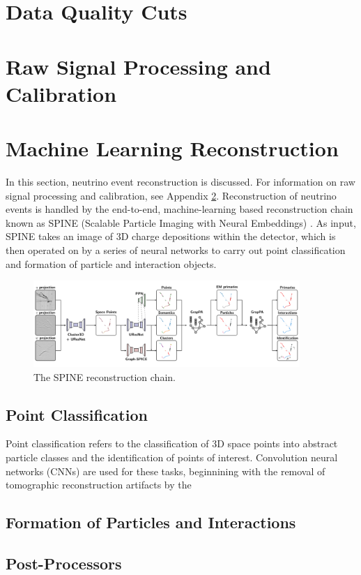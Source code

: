 \documentclass[]{article}
\begin{document}
\begin{appendices}

\section{Data Quality Cuts}
\label{appendix:dataquality}

\section{Raw Signal Processing and Calibration}
\label{appendix:sigandcalib}

\section{Machine Learning Reconstruction}
\label{appendix:mlreco}
In this section, neutrino event reconstruction is discussed.  For information on raw signal processing and calibration, see Appendix \ref{appendix:sigandcalib}.
Reconstruction of neutrino events is handled by the end-to-end, machine-learning based reconstruction chain known as SPINE (Scalable Particle Imaging with Neural Embeddings) \cite{spinepaper}.  As input, SPINE takes an image of 3D charge depositions within the detector, which is then operated on by a series of neural networks to carry out point classification and formation of particle and interaction objects.

\begin{figure}[H]
    \center
    \includegraphics[width=0.90\textwidth]{figures/spinechain.pdf}
    \caption[text]{The SPINE reconstruction chain.}
    \label{fig:spinechain}
\end{figure}

\subsection{Point Classification}
Point classification refers to the classification of 3D space points into abstract particle classes and the identification of points of interest.  Convolution neural networks (CNNs) are used for these tasks, beginnining with the removal of tomographic reconstruction artifacts by the 

\subsection{Formation of Particles and Interactions}

\subsection{Post-Processors}

\end{appendices}
\end{document}
